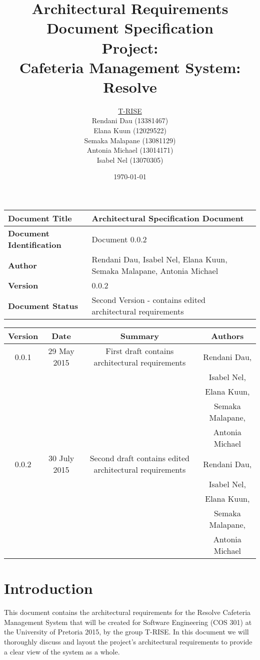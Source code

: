 \documentclass[a4paper,12pt]{article}
\title{\Huge Architectural Requirements Document Specification \\ 
	 Project: \\ 
	Cafeteria Management System: Resolve}
\author{
         \underline{T-RISE}\\
          Rendani Dau (13381467) \\
	Elana Kuun (12029522) \\
	Semaka Malapane (13081129) \\
	Antonia Michael (13014171) \\
	Isabel Nel (13070305)}
\date{\today}
\begin{document}
\maketitle
\break

\tableofcontents
\break

 \begin{tabu} to 0.8\textwidth { | X[l] | X[l] | }
 \hline
 \textbf{Document Title} & Architectural Specification Document \\
 \hline
 \textbf{Document Identification}  & Document 0.0.2 \\
 \hline
 \textbf{Author}  & Rendani Dau, Isabel Nel, Elana Kuun, Semaka Malapane, Antonia Michael \\
 \hline
 \textbf{Version} & 0.0.2\\
 \hline
 \textbf{Document Status} & Second Version - contains edited architectural requirements  \\
 \hline
 \end{tabu}

\begin{table}[h!]
\centering
 \begin{tabular}{||c c c c||} 
 \hline
 \textbf{Version} & \textbf{Date} & \textbf{Summary} & \textbf{Authors} \\ [0.5ex] 
 \hline\hline
 0.0.1 & 29 May 2015 & First draft contains architectural requirements & Rendani Dau, \\ & & & Isabel Nel, \\ & & & Elana Kuun, \\ & & & Semaka Malapane, \\ & & & Antonia Michael \\   [1ex] 
 \hline\hline
 0.0.2 & 30 July 2015 & Second draft contains edited architectural requirements & Rendani Dau, \\ & & & Isabel Nel, \\ & & & Elana Kuun, \\ & & & Semaka Malapane, \\ & & & Antonia Michael \\   [1ex] 
 \hline
 \end{tabular}
\end{table}

\pagebreak


\section{Introduction}
This document contains the architectural requirements for the Resolve Cafeteria Management System that will be created for Software Engineering (COS 301) at the University of Pretoria 2015, by the group T-RISE. In this document we will thoroughly discuss and layout the project's architectural requirements to provide a clear view of the system as a whole.  
\end{document}

